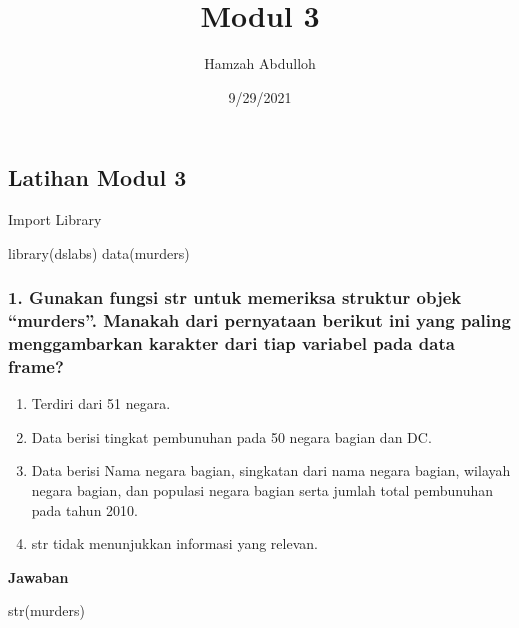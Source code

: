 \documentclass[
]{article}
\title{Modul 3}
\author{Hamzah Abdulloh}
\date{9/29/2021}
\newenvironment{Shaded}{\begin{snugshade}}{\end{snugshade}}
\newcommand{\FunctionTok}[1]{\textcolor[rgb]{0.00,0.00,0.00}{#1}}
\newcommand{\NormalTok}[1]{#1}
\providecommand{\tightlist}{%
  \setlength{\itemsep}{0pt}\setlength{\parskip}{0pt}}
\begin{document}
\maketitle

\hypertarget{latihan-modul-3}{%
\subsection{Latihan Modul 3}\label{latihan-modul-3}}

Import Library

\begin{Shaded}
\begin{Highlighting}[]
\FunctionTok{library}\NormalTok{(dslabs)}
\FunctionTok{data}\NormalTok{(murders) }
\end{Highlighting}
\end{Shaded}

\hypertarget{gunakan-fungsi-str-untuk-memeriksa-struktur-objek-murders.-manakah-dari-pernyataan-berikut-ini-yang-paling-menggambarkan-karakter-dari-tiap-variabel-pada-data-frame}{%
\subsubsection{1. Gunakan fungsi str untuk memeriksa struktur objek
``murders''. Manakah dari pernyataan berikut ini yang paling
menggambarkan karakter dari tiap variabel pada data
frame?}\label{gunakan-fungsi-str-untuk-memeriksa-struktur-objek-murders.-manakah-dari-pernyataan-berikut-ini-yang-paling-menggambarkan-karakter-dari-tiap-variabel-pada-data-frame}}

\begin{enumerate}
\def\labelenumi{\alph{enumi}.}
\tightlist
\item
  Terdiri dari 51 negara.
\item
  Data berisi tingkat pembunuhan pada 50 negara bagian dan DC.
\item
  Data berisi Nama negara bagian, singkatan dari nama negara bagian,
  wilayah negara bagian, dan populasi negara bagian serta jumlah total
  pembunuhan pada tahun 2010.
\item
  str tidak menunjukkan informasi yang relevan.
\end{enumerate}

\textbf{Jawaban}

\begin{Shaded}
\begin{Highlighting}[]
\FunctionTok{str}\NormalTok{(murders)}
\end{Highlighting}
\end{Shaded}
\end{document}
